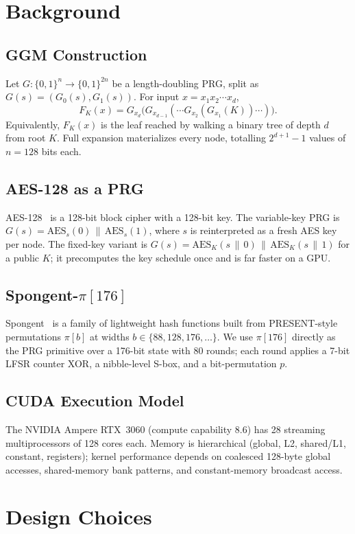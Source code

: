 \documentclass[10pt,conference]{IEEEtran}
\begin{document}
\section{Background}

\subsection{GGM Construction}
Let $G:\{0,1\}^n \to \{0,1\}^{2n}$ be a length-doubling PRG, split as
$G(s) = (G_0(s), G_1(s))$. For input $x = x_1 x_2 \cdots x_d$,
\[
F_K(x) = G_{x_d}\bigl(G_{x_{d-1}}(\cdots G_{x_2}(G_{x_1}(K)) \cdots)\bigr).
\]
Equivalently, $F_K(x)$ is the leaf reached by walking a binary tree of depth
$d$ from root $K$. Full expansion materializes every node, totalling
$2^{d+1}-1$ values of $n = 128$ bits each.

\subsection{AES-128 as a PRG}
AES-128~\cite{fips197} is a 128-bit block cipher with a 128-bit key. The
variable-key PRG is $G(s) = \text{AES}_s(0)\,\|\,\text{AES}_s(1)$, where $s$
is reinterpreted as a fresh AES key per node. The fixed-key variant is
$G(s) = \text{AES}_K(s\,\|\,0)\,\|\,\text{AES}_K(s\,\|\,1)$ for a public $K$;
it precomputes the key schedule once and is far faster on a GPU.

\subsection{Spongent-$\pi[176]$}
Spongent~\cite{spongent2011} is a family of lightweight hash functions built
from PRESENT-style permutations $\pi[b]$ at widths $b \in \{88, 128, 176,
\ldots\}$. We use $\pi[176]$ directly as the PRG primitive over a 176-bit
state with 80 rounds; each round applies a 7-bit LFSR counter XOR, a
nibble-level S-box, and a bit-permutation $p$.

\subsection{CUDA Execution Model}
The NVIDIA Ampere RTX~3060 (compute capability 8.6) has 28 streaming
multiprocessors of 128 cores each. Memory is hierarchical (global, L2,
shared/L1, constant, registers); kernel performance depends on coalesced
128-byte global accesses, shared-memory bank patterns, and constant-memory
broadcast access.

\section{Design Choices}
\label{sec:design}
\end{document}
